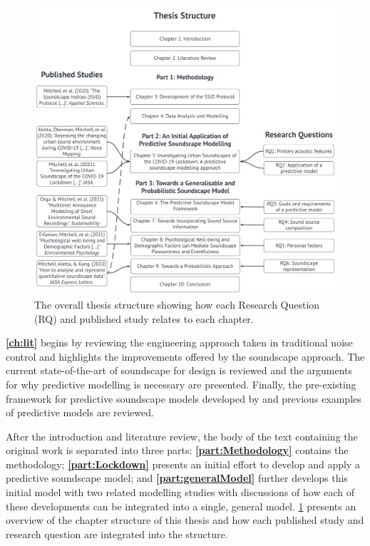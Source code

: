 \begin{figure}
  \centering
  \includegraphics[width=\textwidth]{Figures/Thesis Structure.png}
  \caption{The overall thesis structure showing how each Research Question (RQ) and published study relates to each chapter. \label{fig:thesisStructure}}
\end{figure}

\textbf{\cref{ch:lit}} begins by reviewing the engineering approach taken in traditional noise control and highlights the improvements offered by the soundscape approach. The current state-of-the-art of soundscape for design is reviewed and the arguments for why predictive modelling is necessary are presented. Finally, the pre-existing framework for predictive soundscape models developed by \citet{Aletta2016Soundscape} and previous examples of predictive models are reviewed. 

After the introduction and literature review, the body of the text containing the original work is separated into three parts: \textbf{\cref{part:Methodology}} contains the methodology; \textbf{\cref{part:Lockdown}} presents an initial effort to develop and apply a predictive soundscape model; and \textbf{\cref{part:generalModel}} further develops this initial model with two related modelling studies with discussions of how each of these developments can be integrated into a single, general model. \cref{fig:thesisStructure} presents an overview of the chapter structure of this thesis and how each published study and research question are integrated into the structure.

